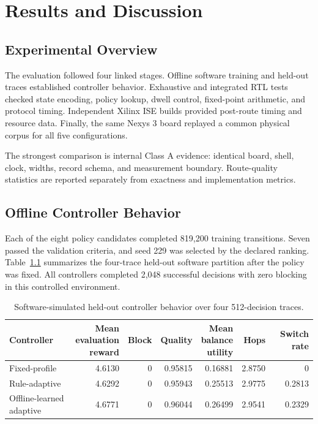 \chapter{Results and Discussion}
\label{chap:results}


\section{Experimental Overview}

The evaluation followed four linked stages. Offline software training and held-out
traces established controller behavior. Exhaustive and integrated RTL tests checked
state encoding, policy lookup, dwell control, fixed-point arithmetic, and protocol
timing. Independent Xilinx ISE builds provided post-route timing and resource data.
Finally, the same Nexys 3 board replayed a common physical corpus for all five
configurations.

The strongest comparison is internal Class A evidence: identical board, shell,
clock, widths, record schema, and measurement boundary. Route-quality statistics
are reported separately from exactness and implementation metrics.

\section{Offline Controller Behavior}

Each of the eight policy candidates completed 819,200 training transitions. Seven
passed the validation criteria, and seed 229 was selected by the declared ranking.
Table~\ref{tab:heldout-software} summarizes the four-trace held-out software
partition after the policy was fixed. All controllers completed 2,048 successful
decisions with zero blocking in this controlled environment.

\begin{table}[H]
\centering
\caption{Software-simulated held-out controller behavior over four
512-decision traces.}
\label{tab:heldout-software}
\begin{tabularx}{\textwidth}{@{}p{}rrrrrr@{}}
\toprule
\textbf{Controller} & \makecell{\textbf{Mean}\\\textbf{evaluation}\\\textbf{reward}} &
\textbf{Block} & \textbf{Quality} &
\makecell{\textbf{Mean}\\\textbf{balance}\\\textbf{utility}} & \textbf{Hops} &
\textbf{Switch rate}\\
\midrule
Fixed-profile & 4.6130 & 0 & 0.95815 & 0.16881 & 2.8750 & 0\\
Rule-adaptive & 4.6292 & 0 & 0.95943 & 0.25513 & 2.9775 & 0.2813\\
Offline-learned adaptive & 4.6771 & 0 & 0.96044 & 0.26499 & 2.9541 & 0.2329\\
\bottomrule
\end{tabularx}
\end{table}

